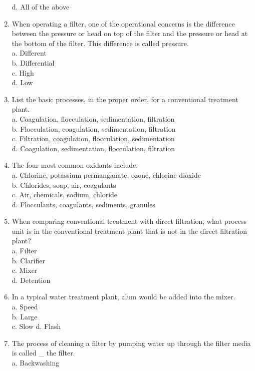 \begin{enumerate}
d. All of the above\\
\item When operating a filter, one of the operational concerns is the difference between the pressure or head on top of the filter and the pressure or head at the bottom of the filter. This difference is called pressure.\\
a. Different\\
b. Differential\\
c. High\\
d. Low\\
\item List the basic processes, in the proper order, for a conventional treatment plant.\\
a. Coagulation, flocculation, sedimentation, filtration\\
b. Flocculation, coagulation, sedimentation, filtration\\
c. Filtration, coagulation, flocculation, sedimentation\\
d. Coagulation, sedimentation, flocculation, filtration\\
\item The four most common oxidants include:\\
a. Chlorine, potassium permanganate, ozone, chlorine dioxide\\
b. Chlorides, soap, air, coagulants\\
c. Air, chemicals, sodium, chloride\\
d. Flocculants, coagulants, sediments, granules\\
\item When comparing conventional treatment with direct filtration, what process unit is in the conventional treatment plant that is not in the direct filtration plant?\\
a. Filter\\
b. Clarifier\\
c. Mixer\\
d. Detention\\
\item In a typical water treatment plant, alum would be added into the mixer.\\
a. Speed\\
b. Large\\
c. Slow d. Flash\\
\item The process of cleaning a filter by pumping water up through the filter media is called \_ the filter.\\
a. Backwashing\\

\end{enumerate}
